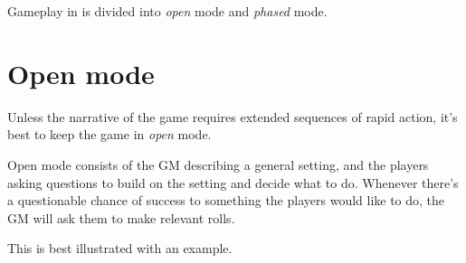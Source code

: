 
Gameplay in \GammaRP{} is divided into \emph{open} mode and \emph{phased} mode.

\section{Open mode}

Unless the narrative of the game requires extended sequences of rapid action, it's best to keep the game in \emph{open} mode.

Open mode consists of the GM describing a general setting, and the players asking questions to build on the setting and decide what to do. Whenever there's a questionable chance of success to something the players would like to do, the GM will ask them to make relevant rolls.

This is best illustrated with an example.

